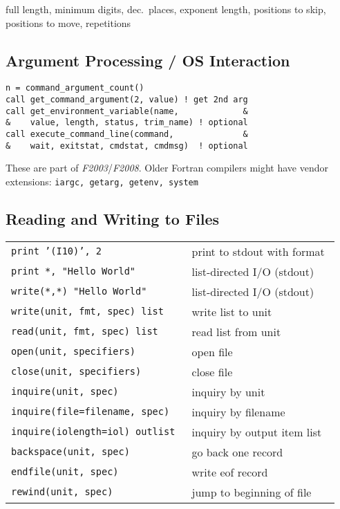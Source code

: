 \documentclass[8pt]{extarticle} %
\begin{document}
\begin{multicols}{3}
  \vspace{1ex}
   full length,
   minimum digits,
   dec.\ places,
   exponent length,
   positions to skip,
   positions to move,
   repetitions

  \vspace{1ex}
  \subsection{Argument Processing / OS Interaction}
  \begin{verbatim}
n = command_argument_count()
call get_command_argument(2, value) ! get 2nd arg
call get_environment_variable(name,             &
&    value, length, status, trim_name) ! optional
call execute_command_line(command,              &
&    wait, exitstat, cmdstat, cmdmsg)  ! optional
  \end{verbatim}

  \vspace{-2ex}
  These are part of \textit{F2003}/\textit{F2008}. Older Fortran compilers might
  have vendor extensions: {\tt iargc, getarg, getenv, system}

  \subsection{Reading and Writing to Files}
  \begin{tabular}{L{0.55\linewidth} L{0.45\linewidth}}
  \tt print~'(I10)',~2                            & print to stdout with format \\
  \tt print~*,~"Hello~World"                      & list-directed I/O (stdout)\\
  \tt write(*,*)~"Hello~World"                    & list-directed I/O (stdout)\\
  \tt write(unit,~fmt,~spec)~list                 & write list to unit \\
  \tt read(unit,~fmt,~spec)~list                  & read list from unit \\
  \tt open(unit,~specifiers)                      & open file \\
  \tt close(unit,~specifiers)                     & close file \\
  \tt inquire(unit,~spec)                         & inquiry by unit \\
  \tt inquire(file=filename,~spec)                & inquiry by filename \\
  \tt inquire(iolength=iol)~outlist               & inquiry by output item list \\
  \tt backspace(unit,~spec)                       & go back one record \\
  \tt endfile(unit,~spec)                         & write eof record \\
  \tt rewind(unit,~spec)                          & jump to beginning of file
  \end{tabular}



\end{multicols}
\end{document}

